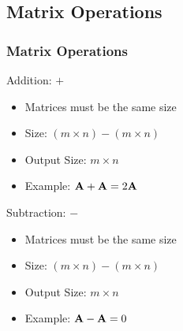 \documentclass[12pt]{beamer}
\begin{document}
\subsection{Matrix Operations}
	\begin{frame}
		\frametitle{Matrix Operations}
			Addition: $+$
			\begin{itemize}
				\item Matrices must be the same size
				\item Size: $(m \times n) - (m\times n)$ 
				\item Output Size: $ m \times n $
				\item Example: $\textbf{\text{A}} + \textbf{\text{A}} = 2\textbf{\text{A}}$ 
			\end{itemize}
			Subtraction: $-$
			\begin{itemize}
				\item Matrices must be the same size
				\item Size: $(m \times n) - (m\times n)$ 
				\item Output Size: $ m \times n $
				\item Example: $\textbf{\text{A}} - \textbf{\text{A}} = 0 $ 
			\end{itemize}
%			
%	
	\end{frame}
\end{document}
